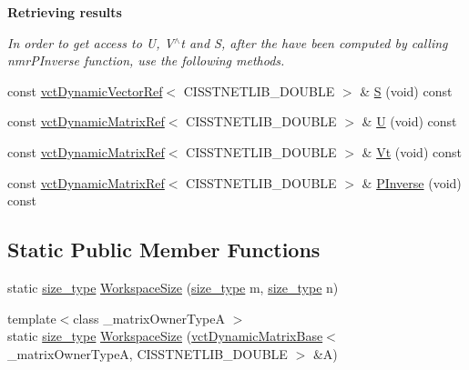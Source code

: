 \begin{Indent}{\bf Retrieving results}\par
{\em In order to get access to U, V$^\wedge$t and S, after the have been computed by calling nmr\+P\+Inverse function, use the following methods. }\begin{DoxyCompactItemize}
\item 
const \hyperlink{classvct_dynamic_vector_ref}{vct\+Dynamic\+Vector\+Ref}$<$ C\+I\+S\+S\+T\+N\+E\+T\+L\+I\+B\+\_\+\+D\+O\+U\+B\+L\+E $>$ \& \hyperlink{classnmr_p_inverse_dynamic_data_a81ff6cbc57fd0aba046c10665396034e}{S} (void) const 
\item 
const \hyperlink{classvct_dynamic_matrix_ref}{vct\+Dynamic\+Matrix\+Ref}$<$ C\+I\+S\+S\+T\+N\+E\+T\+L\+I\+B\+\_\+\+D\+O\+U\+B\+L\+E $>$ \& \hyperlink{classnmr_p_inverse_dynamic_data_a3032d3c852dd54592fcea9de965355a6}{U} (void) const 
\item 
const \hyperlink{classvct_dynamic_matrix_ref}{vct\+Dynamic\+Matrix\+Ref}$<$ C\+I\+S\+S\+T\+N\+E\+T\+L\+I\+B\+\_\+\+D\+O\+U\+B\+L\+E $>$ \& \hyperlink{classnmr_p_inverse_dynamic_data_ade82fb68e98523f912f146e69902aba9}{Vt} (void) const 
\item 
const \hyperlink{classvct_dynamic_matrix_ref}{vct\+Dynamic\+Matrix\+Ref}$<$ C\+I\+S\+S\+T\+N\+E\+T\+L\+I\+B\+\_\+\+D\+O\+U\+B\+L\+E $>$ \& \hyperlink{classnmr_p_inverse_dynamic_data_a456296fc2182819e99d210d093cfc0a4}{P\+Inverse} (void) const 
\end{DoxyCompactItemize}
\end{Indent}
\subsection*{Static Public Member Functions}
\begin{DoxyCompactItemize}
\item 
static \hyperlink{classnmr_p_inverse_dynamic_data_a059041cc0fb800515bffe5bb351b01cb}{size\+\_\+type} \hyperlink{classnmr_p_inverse_dynamic_data_aee681485d8de68b460a65585fea10e68}{Workspace\+Size} (\hyperlink{classnmr_p_inverse_dynamic_data_a059041cc0fb800515bffe5bb351b01cb}{size\+\_\+type} m, \hyperlink{classnmr_p_inverse_dynamic_data_a059041cc0fb800515bffe5bb351b01cb}{size\+\_\+type} n)
\item 
{\footnotesize template$<$class \+\_\+matrix\+Owner\+Type\+A $>$ }\\static \hyperlink{classnmr_p_inverse_dynamic_data_a059041cc0fb800515bffe5bb351b01cb}{size\+\_\+type} \hyperlink{classnmr_p_inverse_dynamic_data_a98152d6fe4a6b4c7e0e7d32f04388f21}{Workspace\+Size} (\hyperlink{classvct_dynamic_matrix_base}{vct\+Dynamic\+Matrix\+Base}$<$ \+\_\+matrix\+Owner\+Type\+A, C\+I\+S\+S\+T\+N\+E\+T\+L\+I\+B\+\_\+\+D\+O\+U\+B\+L\+E $>$ \&A)
\end{DoxyCompactItemize}
